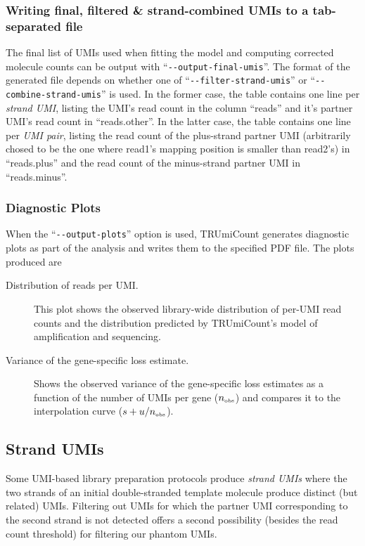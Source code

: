 \documentclass{scrartcl}
\makeatletter
\let\subsection@phlo\subsection
\renewcommand\subsection{\needspace{5\baselineskip}\subsection@phlo}
\newcommand{\ddarg}[1]{\texttt{-{}-#1}}
\makeatother
\begin{document}
\subsubsection*{Writing final, filtered \& strand-combined UMIs to a tab-separated file }

The final list of UMIs used when fitting the model and computing corrected molecule counts can be output with ``\ddarg{output-final-umis}''. The format of the generated file depends on whether one of ``\ddarg{filter-strand-umis}'' or ``\ddarg{combine-strand-umis}'' is used. In the former case, the table contains one line per \emph{strand UMI}, listing the UMI's read count in the column ``reads'' and it's partner UMI's read count in ``reads.other''. In the latter case, the table contains one line per \emph{UMI pair}, listing the read count of the plus-strand partner UMI (arbitrarily chosed to be the one where read1's mapping position is smaller than read2's) in ``reads.plus'' and the read count of the minus-strand partner UMI in ``reads.minus''.

\subsubsection*{Diagnostic Plots}

When the ``\ddarg{output-plots}'' option is used, TRUmiCount generates diagnostic plots as part of the analysis and writes them to the specified PDF file. The plots produced are

\begin{description}
\item[Distribution of reads per UMI.] This plot shows the observed library-wide distribution of per-UMI read counts and the distribution predicted by TRUmiCount's model of amplification and sequencing.

\item[Variance of the gene-specific loss estimate.] Shows the observed variance of the gene-specific loss estimates as a function of the number of UMIs per gene ($n_{\textrm{\tiny obs}}$) and compares it to the interpolation curve ($s + u / n_{\textrm{\tiny obs}}$).
\end{description}

\subsection{Strand UMIs}\label{strand-umis}

Some UMI-based library preparation protocols produce \emph{strand UMIs} where the two strands of an initial double-stranded template molecule produce distinct (but related) UMIs. Filtering out UMIs for which the partner UMI corresponding to the second strand is not detected offers a second possibility (besides the read count threshold) for filtering our phantom UMIs.
\end{document}
